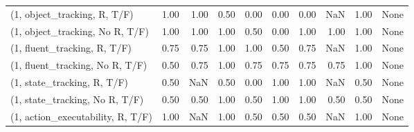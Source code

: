 \begin{table*}[h!]
\begin{adjustbox}{width=2\columnwidth,center}
\begin{tabular}{lrrr|rrr|rrr}
\midrule
(1, object\_tracking, R, T/F)         &                      1.00 &                  1.00 &                      0.50 &                          0.00 &                      0.00 &                          0.00 &                                    NaN &                               1.00 &                                  None \\
(1, object\_tracking, No R, T/F)      &                      1.00 &                  1.00 &                      1.00 &                          0.50 &                      0.00 &                          1.00 &                                   1.00 &                               1.00 &                                  None \\
(1, fluent\_tracking, R, T/F)         &                      0.75 &                  0.75 &                      1.00 &                          1.00 &                      0.50 &                          0.75 &                                    NaN &                               1.00 &                                  None \\
(1, fluent\_tracking, No R, T/F)      &                      0.50 &                  0.75 &                      1.00 &                          0.75 &                      0.75 &                          0.75 &                                   0.75 &                               1.00 &                                  None \\
(1, state\_tracking, R, T/F)          &                      0.50 &                   NaN &                      0.50 &                          0.00 &                      1.00 &                          1.00 &                                    NaN &                               0.50 &                                  None \\
(1, state\_tracking, No R, T/F)       &                      0.50 &                  0.50 &                      1.00 &                          0.50 &                      1.00 &                          1.00 &                                   0.50 &                               0.50 &                                  None \\
(1, action\_executability, R, T/F)    &                      1.00 &                   NaN &                      1.00 &                          0.50 &                      0.50 &                          0.50 &                                    NaN &                               1.00 &                                  None \\

\end{tabular}
\end{adjustbox}
\end{table*}
